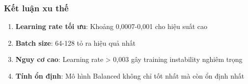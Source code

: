 \subsubsection{Kết luận xu thế}
\begin{enumerate}
    \item \textbf{Learning rate tối ưu}: Khoảng 0,0007-0,001 cho hiệu suất cao
    \item \textbf{Batch size}: 64-128 tỏ ra hiệu quả nhất
    \item \textbf{Nguy cơ cao}: Learning rate > 0,003 gây training instability nghiêm trọng
    \item \textbf{Tính ổn định}: Mô hình Balanced không chỉ tốt nhất mà còn ổn định nhất
\end{enumerate}







